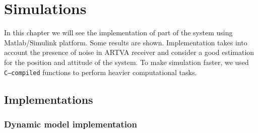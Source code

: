 \chapter{Simulations}
\minitoc
\thispagestyle{plain}

In this chapter we will see the implementation of part of the system using Matlab/Simulink platform. Some results are shown. Implementation takes into account the presence of noise in ARTVA receiver and consider a good estimation for the position and attitude of the system. To make simulation faster, we used \texttt{C--compiled} functions to perform heavier computational tasks. 

\section{Implementations}

\subsection{Dynamic model implementation}

